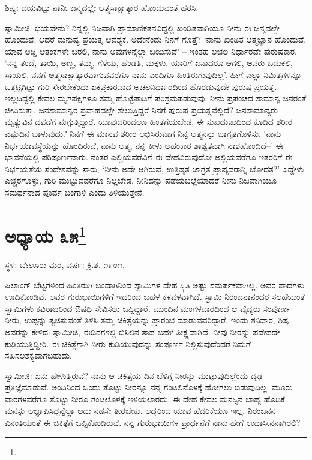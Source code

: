 ಶಿಷ್ಯ: ದಯವಿಟ್ಟು ನಾನೀ ಜನ್ಮದಲ್ಲೇ ಆತ್ಮಸಾಕ್ಷಾತ್ಕಾರ ಹೊಂದುವಂತೆ ಹರಸಿ.

ಸ್ವಾಮೀಜಿ: ಭಯವೇನು? ನಿನ್ನಲ್ಲಿ ನಿಜವಾಗಿ ಪ್ರಾಮಾಣಿಕತನವಿದ್ದಲ್ಲಿ ಖಂಡಿತವಾಗಿಯೂ ನೀನು ಈ ಜನ್ಮದಲ್ಲೇ ಹೊಂದುವೆ. ಆದರೆ ಮನುಷ್ಯ ಪ್ರಯತ್ನ ಆವಶ್ಯಕ. ಅದೇನೆಂದು ನಿನಗೆ ಗೊತ್ತೆ? ‘ನಾನು ಖಂಡಿತ ಆತ್ಮಜ್ಞಾನ ಹೊಂದುವೆ. ಯಾವ ಅಡ್ಡಿ ಆತಂಕಗಳೇ ಬರಲಿ, ನಾನು ಅವುಗಳನ್ನೆಲ್ಲಾ ಜಯಿಸುವೆ’ – ಇಂತಹ ಅಚಲ ನಿರ್ಧಾರವೇ ಪುರುಷಕಾರ, ‘ನನ್ನ ತಂದೆ, ತಾಯಿ, ಅಣ್ಣ, ತಮ್ಮ, ಗೆಳೆಯ, ಹೆಂಡತಿ, ಮಕ್ಕಳು, ಯಾರಿಗೆ ಏನಾದರೂ ಆಗಲಿ, ಅವರು ಬದುಕಲಿ, ಸಾಯಲಿ, ನನಗೆ ಆತ್ಮಸಾಕ್ಷಾತ್ಕಾರವಾಗುವವರೆಗೂ ನಾನು ಎಂದಿಗೂ ಹಿಂತಿರುಗುವುದಿಲ್ಲ’. ಹೀಗೆ ಎಲ್ಲಾ ನಿಮಿತ್ತಗಳನ್ನೂ ಒತ್ತಟ್ಟಿಗಿಟ್ಟು ಗುರಿ ಸೇರಬೇಕೆಂದು ಏಕಪ್ರಕಾರವಾದ ಅಚಲನಿರ್ಧಾರದಿಂದ ಹೊರಡುವುದೇ ಪುರುಷ ಪ್ರಯತ್ನ. ಇಲ್ಲದಿದ್ದಲ್ಲಿ ಕೇವಲ ಮೃಗಪಕ್ಷಿಗಳೂ ತಮ್ಮ ಹೊಟ್ಟೆಪಾಡಿಗೆ ಪರಿಶ್ರಮಪಡುವುವು. ನೀನು ಪ್ರಪಂಚದ ಸಾಮಾನ್ಯ ಜನರಂತೆ ಜೀವಿಸುತ್ತಾ, ಜನಸಾಮಾನ್ಯರ ಪ್ರವಾಹದಲ್ಲೇ ತೇಲುತ್ತಿದ್ದರೆ ನಿನಗೆ ಪುರುಷ ಪ್ರಯತ್ನವೆಲ್ಲಿದೆ? ಜನಸಾಮಾನ್ಯರು ಮೃತ್ಯುವಿನ ದವಡೆಗೆ ನುಗ್ಗುತ್ತಿದ್ದಾರೆ. ಯಾವುದರಿಂದಲೂ ಹಿಂತೆಗೆಯಬೇಡ, ಈ ಸುಖದುಃಖದಿಂದ ಕೂಡಿದ ಶರೀರ ಎಷ್ಟುದಿನ ಬಾಳುವುದು? ನಿನಗೆ ಈ ಮಾನವ ಶರೀರ ಲಭಿಸಿರುವಾಗ ನಿನ್ನ ಆತ್ಮನನ್ನು ಜಾಗೃತಗೊಳಿಸು. ‘ನಾನು ನಿರ್ಭಯಾವಸ್ಥೆಯನ್ನು ಹೊಂದಿರುವೆ, ನಾನು ಆತ್ಮ, ನನ್ನ ಕೀಳು ಅಹಂಕಾರ ಶಾಶ್ವತವಾಗಿ ನಾಶಹೊಂದಿದೆ–’ ಈ ಭಾವನೆಯಲ್ಲಿ ಪರಿಪೂರ್ಣನಾಗು. ನಂತರ ಎಲ್ಲಿಯವರೆವಿಗೆ ಈ ದೇಹವಿರುವುದೋ ಅಲ್ಲಿಯವರೆಗೂ ಇತರರಿಗೆ ಈ ನಿರ್ಭಯತೆಯ ಸಂದೇಶವನ್ನು ಸಾರು, ‘ನೀನು ಅದೇ ಆಗಿರುವೆ, ಉತ್ತಿಷ್ಠತ ಜಾಗ್ರತ ಪ್ರಾಪ್ಯವರಾನ್ನಿ ಬೋಧತ?’ ಎದ್ದೇಳು ಎಚ್ಚರಗೊಳ್ಳು, ಗುರಿ ಮುಟ್ಟುವವರೆಗೂ ನಿಲ್ಲಬೇಡ. ನೀನಿದನ್ನು ಪಡೆಯಬಲ್ಲೆಯಾದರೆ ನೀನು ನಿಜವಾಗಿಯೂ ಸಮರ್ಥನಾದ ಪೂರ್ವ ಬಂಗಾಳಿ ಎಂದು ತಿಳಿಯುತ್ತೇನೆ.

\newpage

\chapter[ಅಧ್ಯಾಯ ೩೫]{ಅಧ್ಯಾಯ ೩೫\protect\footnote{}}

\centerline{ಸ್ಥಳ: ಬೇಲೂರು ಮಠ, ವರ್ಷ: ಕ್ರಿ.ಶ. ೧೯೦೧.}

ಷಿಲ್ಲಾಂಗ್ ಬೆಟ್ಟಗಳಿಂದ ಹಿಂತಿರುಗಿ ಬಂದಾಗಿನಿಂದ ಸ್ವಾಮಿಗಳ ದೇಹ ಸ್ಥಿತಿ ಅಷ್ಟು ಸಮರ್ಪಕವಾಗಿಲ್ಲ. ಅವರ ಪಾದಗಳು ಊದಿಕೊಂಡಿವೆ. ಅವರ ಗುರುಭಾಯಿಗಳಿಗೆ ಇದರಿಂದ ಬಹಳ ಕಳವಳವಾಗಿದೆ. ಸ್ವಾಮಿ ನಿರಂಜನಾನಂದರ ಸಲಹೆಯಂತೆ ಸ್ವಾಮಿಗಳು ಕವಿರಾಜರಿಂದ ಔಷಧಿ ಸೇವಿಸಲು ಒಪ್ಪಿದ್ದಾರೆ. ಮುಂದಿನ ಮಂಗಳವಾರದಿಂದ ಆ ವೈದ್ಯರು ಸಂಪೂರ್ಣ ನೀರು, ಉಪ್ಪನ್ನು ತ್ಯಜಿಸುವಂತೆ ತಿಳಿಸಿ ತಮ್ಮ ಚಿಕಿತ್ಸೆಯನ್ನು ಪ್ರಾರಂಭ ಮಾಡುವವರಿದ್ದಾರೆ. ಇಂದು ಶನಿವಾರ, ಶಿಷ್ಯ ಅವರನ್ನು ಕೇಳಿದ: ಸ್ವಾಮೀಜಿ, ಈದಿನಗಳಲ್ಲಿ ಬಿಸಿಲಿನ ತಾಪ ಬಹಳ ತೀಕ್ಷ್ಣವಾಗಿದೆ. ನೀವು ನೀರನ್ನು ಪದೇಪದೇ ಕುಡಿಯುತ್ತಿದ್ದೀರಿ. ಈ ಚಿಕಿತ್ಸೆಗಾಗಿ ನೀರು ಕುಡಿಯುವುದನ್ನು ಸಂಪೂರ್ಣ ನಿಲ್ಲಿಸುವುದೆಂದರೆ ನಿಮಗೆ ಸಹಿಸಲಶಕ್ಯವಾಗಬಹುದು.

ಸ್ವಾಮೀಜಿ: ಏನು ಹೇಳುತ್ತಿರುವೆ? ನಾನು ಆ ಚಿಕಿತ್ಸೆಯ ದಿನ ಬೆಳಿಗ್ಗೆ ನೀರನ್ನು ಮುಟ್ಟುವುದಿಲ್ಲೆಂದು ದೃಢ ಪ್ರತಿಜ್ಞೆಮಾಡುವೆ. ಅಂದಿನಿಂದ ಒಂದು ತೊಟ್ಟು ನೀರನ್ನೂ ನನ್ನ ಗಂಟಲಿನೊಳಕ್ಕೆ ಹೋಗಲು ಬಿಡುವುದಿಲ್ಲ. ಮೂರು ವಾರಗಳವರೆಗೂ ತೊಟ್ಟು ನೀರೂ ಗಂಟಲೊಳಕ್ಕೆ ಇಳಿಯಲಾರದು. ಈ ದೇಹ ಕೇವಲ ಮನಸ್ಸಿನ ಬಾಹ್ಯ ಹೊದಿಕೆ. ಮನಸ್ಸು ಆಜ್ಞಾಪಿಸಿದ್ದನ್ನೆಲ್ಲಾ ಅದು ನಡಸೇ ತೀರಬೇಕು. ಆದ್ದರಿಂದ ಯಾವ ಹೆದರಿಕೆಯೂ ಇಲ್ಲ. ನಿರಂಜನನ ವಿನಂತಿಯಂತೆ ಈ ಚಿಕಿತ್ಸೆಗೆ ಒಪ್ಪಿಕೊಂಡಿರುವೆ. ನನ್ನ ಗುರುಭಾಯಿಗಳ ಪ್ರಾರ್ಥನೆಗೆ ನಾನು ಹೇಗೆ ಉದಾಸೀನನಾಗಿರಲಿ?

